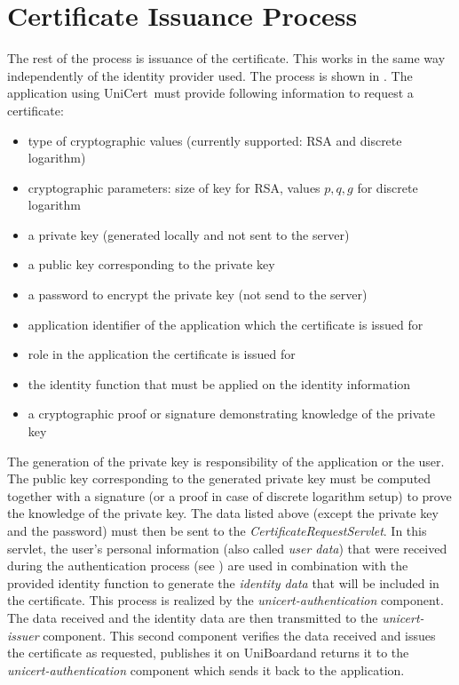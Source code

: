 \documentclass[oneside]{scrreprt}
\newcommand{\uniboard}{\mbox{UniBoard}}
\newcommand{\unicert}{\mbox{UniCert}}
\begin{document}
\section{Certificate Issuance Process} \label{sec:issuance_process}

The rest of the process is issuance of the certificate. This works in the same way independently of the identity provider used. The process is shown in . The application using \unicert\ must provide following information to request a certificate: 
\begin{itemize}
\item type of cryptographic values (currently supported: RSA and discrete logarithm)
\item cryptographic parameters: size of key for RSA, values $p,q,g$ for discrete logarithm
\item a private key (generated locally and not sent to the server)
\item a public key corresponding to the private key
\item a password to encrypt the private key (not send to the server)
\item application identifier of the application which the certificate is issued for
\item role in the application the certificate is issued for
\item the identity function that must be applied on the identity information
\item a cryptographic proof or signature demonstrating knowledge of the private key
\end{itemize}

The generation of the private key is responsibility of the application or the user. The public key corresponding to the generated private key must be computed together with a signature (or a proof in case of discrete logarithm setup) to prove the knowledge of the private key. The data listed above (except the private key and the password) must then be sent to the \textit{CertificateRequestServlet}. In this servlet, the user's personal information (also called \textit{user data}) that were received during the authentication process (see ) are used in combination with the provided identity function to generate the \textit{identity data} that will be included in the certificate. This process is realized by the \textit{unicert-authentication} component. The data received and the identity data are then transmitted to the \textit{unicert-issuer} component. This second component verifies the data received and issues the certificate as requested, publishes it on \uniboard and returns it to the \textit{unicert-authentication} component which sends it back to the application. 
\end{document}

